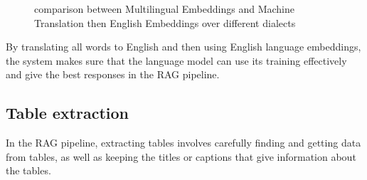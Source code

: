\begin{itemize}
\begin{figure}[H]
    \caption{comparison between Multilingual Embeddings and Machine Translation then English Embeddings over different dialects}
    \label{fig:comp_multilingual}
\end{figure}
\vskip 0.5cm
By translating all words to English and then using English language embeddings, the system makes sure that the language model can use its training effectively and give the best responses in the RAG pipeline.
\end{itemize}
\subsection{Table extraction}
In the RAG pipeline, extracting tables involves carefully finding and getting data from tables, as well as keeping the titles or captions that give information about the tables.
\vskip 0.5cm
